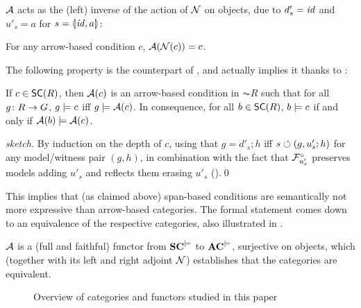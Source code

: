 $\mathcal{A}$ acts as the (left) inverse of the action of $\mathcal{N}$ on objects, due to $d'_s=\mathit{id}$ and $u'_s=a$ for $s=\spanof{\id}{a}$:
%
\begin{lemma}
For any arrow-based condition $c$, $\mathcal{A}(\mathcal{N}(c))=c$.
\end{lemma}
%
The following property is the counterpart of , and actually implies it thanks to :
%
\begin{proposition}
If $c\in \SC R$, then $\mathcal{A}(c)$ is an arrow-based condition in $\AC R$ such that for all $g\colon R\rightarrow G$, $g\models c$ iff $g\models\mathcal{A}(c)$. In consequence, for all $b\in \SC R$, $b\models c$ if and only if $\mathcal{A}(b)\models \mathcal{A}(c)$.
\end{proposition}
%
\begin{proof}[sketch]
By induction on the depth of $c$, using that $g=d'_s;h$ iff $s\circlearrowleft (g,u'_s;h)$ for any model/witness pair $(g,h)$, in combination with the fact that $\mathcal{F}^\circ_{u'_s}$ preserves models adding $u'_s$ and reflects them erasing $u'_s$ ().\qed
\end{proof}
%
This implies that (as claimed above) span-based conditions are semantically not more expressive than arrow-based categories. The formal statement comes down to an equivalence of the respective categories, also illustrated in .
%
\begin{theorem}
$\mathcal{A}$ is a (full and faithful) functor from $\mathbf{SC}^{\models}$ to $\mathbf{AC}^{\models}$, surjective on objects, which (together with its left and right adjoint $\mathcal{N}$) establishes that the categories are equivalent.
\end{theorem}


\begin{figure}[t]
\centering

\caption{Overview of categories and functors studied in this paper}
\end{figure}

